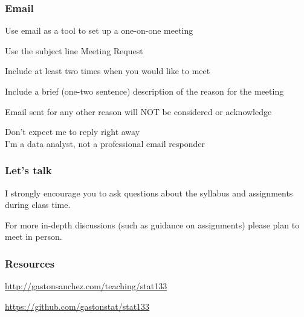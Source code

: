 \documentclass[12pt]{beamer}\usepackage[]{graphicx}\usepackage[]{color}
\begin{document}

\begin{frame}
\frametitle{Email}

\bi
 \item Use email as a tool to set up a one-on-one meeting
 \item Use the subject line {\hilit Meeting Request}
 \item Include at least two times when you would like to meet 
 \item Include a brief (one-two sentence) description of the reason for the meeting
 \item Email sent for any other reason will NOT be considered or acknowledge
 \item Don't expect me to reply right away \\
 {\lolit I'm a data analyst, not a professional email responder}
\ei
\eb

\end{frame}


\begin{frame}
\frametitle{Let's talk}

I strongly encourage you to ask questions about the syllabus and assignments during class time. 

\bigskip
For more in-depth discussions (such as guidance on assignments) please plan to meet in person.
\eb

\end{frame}


\begin{frame}
\frametitle{Resources}

  \url{http://gastonsanchez.com/teaching/stat133}
\eb

  \url{https://github.com/gastonstat/stat133}
\eb

\end{frame}


\begin{frame}
\begin{center}
\Huge{}
\end{center}
\end{frame}
\end{document}
